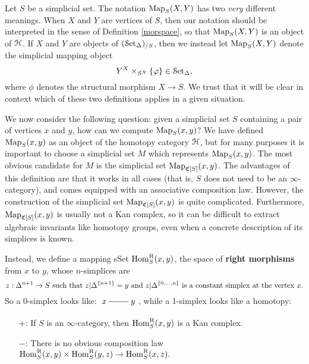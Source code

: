 \begin{1.2.2 Mapping spaces}
\begin{warning}
Let $S$ be a simplicial set. The notation $\operatorname{{Map}}_{S}( X, Y)$ has two {\em very} different meanings.
When $X$ and $Y$ are vertices of $S$, then our notation should be interpreted in the sense of Definition \ref{morspace}, so that $\operatorname{{Map}}_{S}(X,Y)$ is an object of $\operatorname{\mathcal{H}}$. If $X$ and $Y$ are objects of $(\operatorname{\mathcal{S}et_{\Delta}})_{/S}$, then we instead let $\operatorname{{Map}}_{S}(X,Y)$ denote the simplicial mapping object
$$ Y^{X} \times_{ S^{X} } \{ \varphi \} \in \operatorname{\mathcal{S}et_{\Delta}},$$
where $\phi$ denotes the structural morphism $X \rightarrow S$. We trust that it will be clear in context which of these two definitions applies in a given situation.
\end{warning}

We now consider the following question: given a simplicial set $S$ containing a pair of vertices $x$ and $y$, how can we compute $\operatorname{{Map}}_{S}(x,y)$? We have defined
$\operatorname{{Map}}_{S}(x,y)$ as an object of the homotopy category $\operatorname{\mathcal{H}}$, but for many purposes it is important to choose a simplicial set $M$ which represents $\operatorname{{Map}}_{S}(x,y)$. 
The most obvious candidate for $M$ is the simplicial set
$\operatorname{{Map}}_{\operatorname{\mathfrak{C}}[S]}(x,y)$. The advantages of this definition are that it works in all cases (that is, $S$ does not need to be an $\infty$-category), and comes equipped with an associative composition law. However, the construction of the simplicial set
$\operatorname{{Map}}_{\operatorname{\mathfrak{C}}[S]}(x,y)$ is quite complicated. Furthermore,
$\operatorname{{Map}}_{\operatorname{\mathfrak{C}}[S]}(x,y)$ is usually not a Kan complex, so it
can be difficult to extract algebraic invariants like homotopy
groups, even when a concrete description of its simplices is known. 
\begin{shaded}
Instead, we define a mapping sSet  $\operatorname{Hom}^{\operatorname{R}}_S(x,y)$, the space of \textbf{right morphisms} from $x$ to $y$, whose $n$-simplices are
\[\textup{$z: \Delta^{n+1} \rightarrow S$ such that $z| \Delta^{ \{n+1 \}} = y$ and $z|
\Delta^{ \{0, \ldots, n\} }$ is a constant simplex at the vertex
$x$.}\]
So a 0-simplex looks like: \!$\xymatrix@R=3mm@C=3mm{x\ar@{-}[rr]&&y}$\!, while a 1-simplex looks like a homotopy:
\!
\begin{enumerate}\squishlist
\item[$+$:] If $S$ is an $\infty$-category, then $\operatorname{Hom}^{\operatorname{R}}_{S}(x,y)$ is a Kan complex.
\item[$-$:] There is no
obvious composition law
$\operatorname{Hom}^{\operatorname{R}}_{S}(x,y) \times \operatorname{Hom}^{\operatorname{R}}_{S}(y,z) \rightarrow \operatorname{Hom}^{\operatorname{R}}_{S}(x,z).$

\end{enumerate}
\end{shaded}
\end{1.2.2 Mapping spaces}
